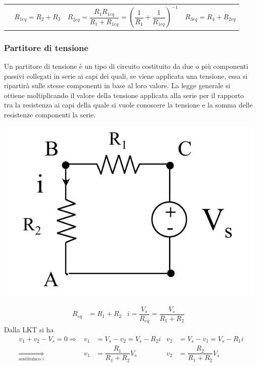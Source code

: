 \documentclass{article}
\begin{document}
\begin{center}
\begin{tabular}{c c c c}
    &
    $R_{1eq} = R_2+R_3$
    &
    $R_{2eq} =\dfrac{R_1 R_{1eq}}{R_1+R_{1eq}} = \left( \dfrac{1}{R_1} + \dfrac{1}{R_{1eq}} \right)^{-1}$
    &
    $R_{3eq} = R_4 + R_{2eq} $
\end{tabular}
\end{center}


\subsubsection{Partitore di tensione}
Un partitore di tensione è un tipo di circuito costituito da due o più componenti passivi collegati in serie ai capi dei quali, se viene applicata una tensione, essa si ripartirà sulle stesse componenti in base al loro valore. La legge generale si ottiene moltiplicando il valore della tensione applicata alla serie per il rapporto tra la resistenza ai capi della quale si vuole conoscere la tensione e la somma delle resistenze componenti la serie.
\begin{center}
    \includegraphics[scale=0.35]{Image/Partitore di tensione.png}
\end{center}
\begin{align*}
    R_{eq} &= R_1+R_2 & i = \dfrac{V_s}{R_{eq}} = \dfrac{V_s}{R_1+R_2}
\end{align*}
Dalla LKT si ha
\begin{align*}
    &v_1+v_2 - V_s = 0 \Longrightarrow & v_1&=V_s - v_2 = V_s - R_2 i & v_2 &= V_s-v_1 = V_s - R_1 i\\
    &\underset{\text{sostituisco } i}{\Longrightarrow} & v_1&=\dfrac{R_1}{R_1+R_2} V_s & v_2&=\dfrac{R_2}{R_1+R_2} V_s
\end{align*}
\end{document}
